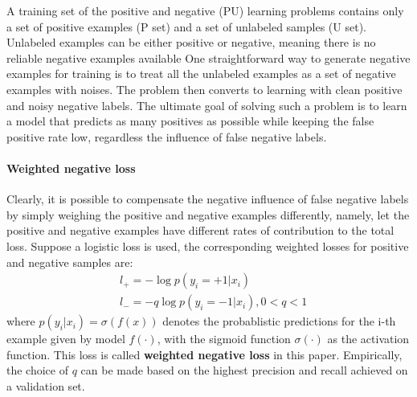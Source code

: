A training set of the positive and negative (PU) learning problems contains only a set of positive examples (P set) and a set of unlabeled samples (U set).
Unlabeled examples can be either positive or negative, meaning there is no reliable negative examples available
One straightforward way to generate negative examples for training is to treat all the unlabeled examples as a set of negative examples with noises.
The problem then converts to learning with clean positive and noisy negative labels.
The ultimate goal of solving such a problem is to learn a model that predicts as many positives as possible while keeping the false positive rate low, regardless the influence of false negative labels.



\paragraph{Weighted negative loss}

Clearly, it is possible to compensate the negative influence of false negative labels by simply weighing the positive and negative examples differently, namely, let the positive and negative examples have different rates of contribution to the total loss.
Suppose a logistic loss is used, the corresponding weighted losses for positive and negative samples are:
\begin{equation*}
  \begin{aligned}
    & l_{+} = - \log p(y_i=+1|x_i) \\
    & l_{-} = - q \log p(y_i=-1 \vert x_i), 0<q<1
  \end{aligned}
\end{equation*}
where $p(y_i \vert x_i)=\sigma(f(x))$ denotes the probablistic predictions for the i-th example given by model $f(\cdot)$, with the sigmoid function $\sigma(\cdot)$ as the activation function.
This loss is called \textbf{weighted negative loss} in this paper.
Empirically, the choice of $q$ can be made based on the highest precision and recall achieved on a validation set.



